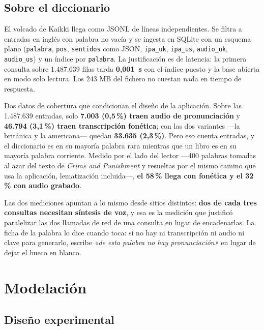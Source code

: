 \documentclass[11pt,a4paper]{article}
\newcommand{\cod}[1]{\texttt{\small #1}}
\newcommand{\pct}{\,\%}
\begin{document}
\subsection{Sobre el diccionario}

El volcado de Kaikki llega como JSONL de líneas independientes. Se filtra a entradas en
inglés con palabra no vacía y se ingesta en SQLite con un esquema plano (\cod{palabra},
\cod{pos}, \cod{sentidos} como JSON, \cod{ipa\_uk}, \cod{ipa\_us}, \cod{audio\_uk},
\cod{audio\_us}) y un índice por \cod{palabra}. La justificación es de latencia: la
primera consulta sobre 1.487.639 filas tarda \textbf{0,001~s} con el índice puesto y la
base abierta en modo solo lectura. Los 243 MB del fichero no cuestan nada en tiempo de
respuesta.

Dos datos de cobertura que condicionan el diseño de la aplicación. Sobre las 1.487.639
entradas, solo \textbf{7.003 (0,5\pct) traen audio de pronunciación} y \textbf{46.794
(3,1\pct) traen transcripción fonética}; con las dos variantes ---la británica y la
americana--- quedan \textbf{33.635 (2,3\pct)}. Pero eso cuenta entradas, y el diccionario
es en su mayoría palabra rara mientras que un libro es en su mayoría palabra corriente.
Medido por el lado del lector ---400 palabras tomadas al azar del texto de \emph{Crime and
Punishment} y resueltas por el mismo camino que usa la aplicación, lematización
incluida---, \textbf{el 58\pct{} llega con fonética y el 32\pct{} con audio grabado}.

Las dos mediciones apuntan a lo mismo desde sitios distintos: \textbf{dos de cada tres
consultas necesitan síntesis de voz}, y esa es la medición que justificó paralelizar las
dos llamadas de red de una consulta en lugar de encadenarlas. La ficha de la palabra lo
dice cuando toca: si no hay ni transcripción ni audio ni clave para generarlo, escribe
\emph{«de esta palabra no hay pronunciación»} en lugar de dejar el hueco en blanco.

\section{Modelación}
\label{sec:modelacion}

\subsection{Diseño experimental}
\end{document}
